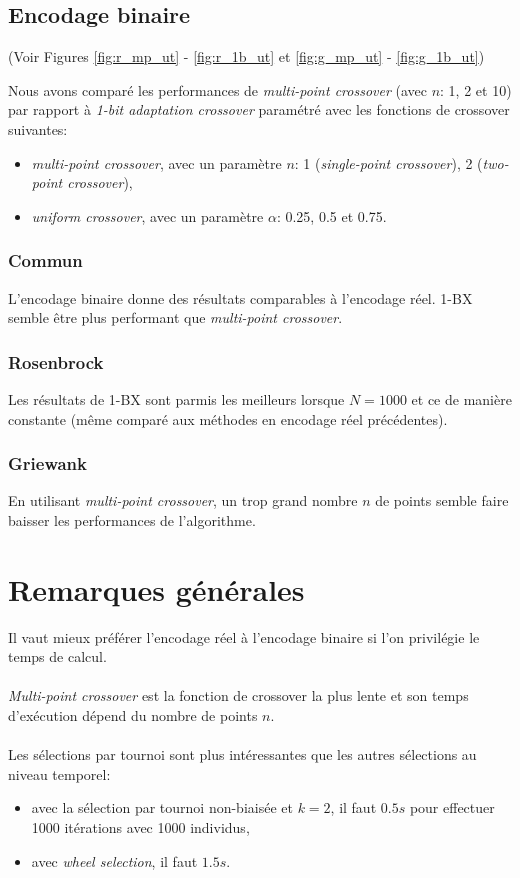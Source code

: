 \documentclass[12pt, letterpaper]{article}
\begin{document}
\subsection{Encodage binaire}

(Voir Figures \ref{fig:r_mp_ut} - \ref{fig:r_1b_ut}
et \ref{fig:g_mp_ut} - \ref{fig:g_1b_ut})

Nous avons comparé les performances de \textit{multi-point crossover} (avec
$n$: 1, 2 et 10) par rapport à \textit{1-bit adaptation crossover} paramétré
avec les fonctions de crossover suivantes:
\begin{itemize}
\item \textit{multi-point crossover}, avec un paramètre $n$: 1 (\textit{single-point crossover}), 2 (\textit{two-point crossover}),
  
\item \textit{uniform crossover}, avec un paramètre $\alpha$: 0.25, 0.5 et 0.75.
  
\end{itemize}

\subsubsection{Commun}
L'encodage binaire donne des résultats comparables à l'encodage réel.
1-BX semble être plus performant que \textit{multi-point crossover}.

\subsubsection{Rosenbrock}
Les résultats de 1-BX sont parmis les meilleurs lorsque $N = 1000$ et
ce de manière constante (même comparé aux méthodes en encodage réel
précédentes).

\subsubsection{Griewank}
En utilisant \textit{multi-point crossover}, un trop grand nombre $n$
de points semble faire baisser les performances de l'algorithme.

\section{Remarques générales}
Il vaut mieux préférer l'encodage réel à l'encodage binaire si l'on
privilégie le temps de calcul.
\\
\\
\textit{Multi-point crossover} est la fonction de crossover la plus
lente et son temps d'exécution dépend du nombre de points $n$.
\\
\\
Les sélections par tournoi sont plus intéressantes que les autres
sélections au niveau temporel:
\begin{itemize}
\item avec la sélection par tournoi non-biaisée et $k = 2$, il faut
  $0.5s$ pour effectuer 1000 itérations avec 1000 individus,
  
\item avec \textit{wheel selection}, il faut $1.5s$.\\
\end{itemize}
\end{document}
